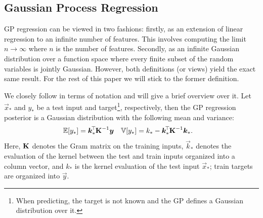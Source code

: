 \subsection{Gaussian Process Regression}

	\ac{GP} regression can be viewed in two fashions:
	firstly, as an extension of linear regression to an infinite number of features.
	This involves computing the limit $n \to \infty$ where $n$ is the number of features.
	Secondly, as an infinite Gaussian distribution over a function space where every finite subset of the random variables is jointly Gaussian.
	However, both definitions (or views) yield the exact same result.
	For the rest of this paper we will stick to the former definition.

	We closely follow\cite{rasmussenGaussianProcessesMachine2006} in terms of notation and will give a brief overview over it.
	Let \(\vec{x}_\ast\) and \(y_\ast\) be a test input and target\footnote{When predicting, the target is not known and the \ac{GP} defines a Gaussian distribution over it.}, respectively, then the \ac{GP} regression posterior is a Gaussian distribution with the following mean and variance:
	\begin{equation}
		\begin{aligned}
			\mathbb{E}[y_\ast] &= \bm{k}_\ast^{\!\top\!} \bm{\mathrm{K}}^{-1} \bm{y} &
			\mathbb{V}[y_\ast] &= k_\ast - \bm{k}_\ast^{\!\top\!} \bm{\mathrm{K}}^{-1} \bm{k}_\ast.
		\end{aligned}
		\label{eq:gp}
	\end{equation}
	Here, \( \bm{\mathrm{K}} \) denotes the Gram matrix on the training inputs, \(\vec{k}_\ast\) denotes the evaluation of the kernel between the test and train inputs organized into a column vector, and \(k_\ast\) is the kernel evaluation of the test input \(\vec{x}_\ast\); train targets are organized into \(\vec{y}\).

